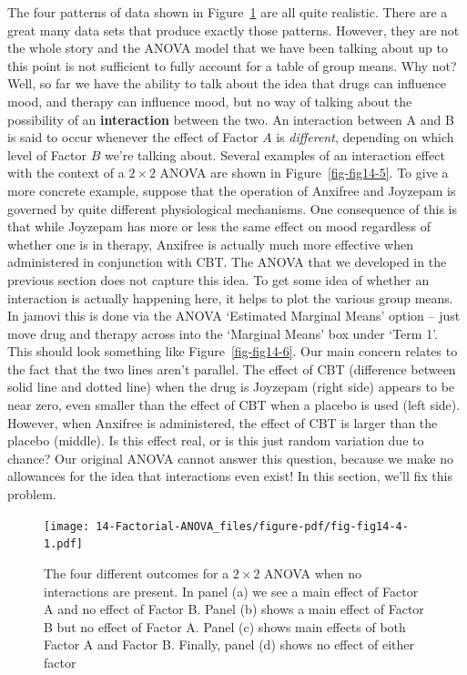 \documentclass[
  a4paper,
]{book}
\begin{document}
The four patterns of data shown in Figure~\ref{fig-fig14-4} are all
quite realistic. There are a great many data sets that produce exactly
those patterns. However, they are not the whole story and the ANOVA
model that we have been talking about up to this point is not sufficient
to fully account for a table of group means. Why not? Well, so far we
have the ability to talk about the idea that drugs can influence mood,
and therapy can influence mood, but no way of talking about the
possibility of an \textbf{interaction} between the two. An interaction
between A and B is said to occur whenever the effect of Factor \(A\) is
\emph{different}, depending on which level of Factor \(B\) we're talking
about. Several examples of an interaction effect with the context of a
\(2 \times 2\) ANOVA are shown in Figure~\ref{fig-fig14-5}. To give a
more concrete example, suppose that the operation of Anxifree and
Joyzepam is governed by quite different physiological mechanisms. One
consequence of this is that while Joyzepam has more or less the same
effect on mood regardless of whether one is in therapy, Anxifree is
actually much more effective when administered in conjunction with CBT.
The ANOVA that we developed in the previous section does not capture
this idea. To get some idea of whether an interaction is actually
happening here, it helps to plot the various group means. In jamovi this
is done via the ANOVA `Estimated Marginal Means' option -- just move
drug and therapy across into the `Marginal Means' box under `Term 1'.
This should look something like Figure~\ref{fig-fig14-6}. Our main
concern relates to the fact that the two lines aren't parallel. The
effect of CBT (difference between solid line and dotted line) when the
drug is Joyzepam (right side) appears to be near zero, even smaller than
the effect of CBT when a placebo is used (left side). However, when
Anxifree is administered, the effect of CBT is larger than the placebo
(middle). Is this effect real, or is this just random variation due to
chance? Our original ANOVA cannot answer this question, because we make
no allowances for the idea that interactions even exist! In this
section, we'll fix this problem.

\begin{figure}

\texttt{[image: 14-Factorial-ANOVA\_files/figure-pdf/fig-fig14-4-1.pdf]} \hfill{}

\caption{\label{fig-fig14-4}The four different outcomes for a
\(2 \times 2\) ANOVA when no interactions are present. In panel (a) we
see a main effect of Factor A and no effect of Factor B. Panel (b) shows
a main effect of Factor B but no effect of Factor A. Panel (c) shows
main effects of both Factor A and Factor B. Finally, panel (d) shows no
effect of either factor}

\end{figure}
\end{document}

